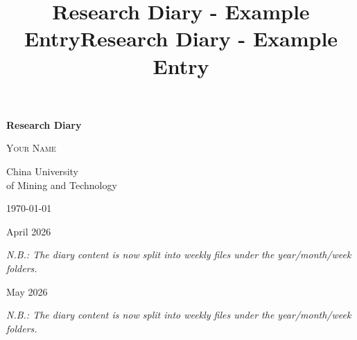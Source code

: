\documentclass[12pt,letterpaper]{ctexart}
\newcommand{\workingDate}{}
\newcommand{\userName}{Your Name}
\newcommand{\institution}{China University\\of Mining and Technology}
\begin{document}
\begin{titlepage}
\thispagestyle{empty}
\pagestyle{empty}
\centering
\vspace*{2cm}
{\Huge\bfseries Research Diary\par}
\vspace*{\fill}
{\huge \textsc{\userName}\par}
\vspace{0.8cm}
{\Large \institution\par}
\vspace*{\fill}
{\Large \today\par}
\vspace*{1.5cm}
\end{titlepage}

\renewcommand{\contentsname}{Contents}
\tableofcontents
\clearpage

\clearpage
\pagestyle{fancy}

\univlogo

\title{Research Diary - Example Entry}

\renewcommand{\workingDate}{\textsc{2026 $|$ April $|$ 01}}
{\Huge April 2026}\\[2mm]

\textit{N.B.: The diary content is now split into weekly files under the year/month/week folders.}




\newpage
\univlogo

\title{Research Diary - Example Entry}

\renewcommand{\workingDate}{\textsc{2026 $|$ May $|$ 01}}
{\Huge May 2026}\\[2mm]

\textit{N.B.: The diary content is now split into weekly files under the year/month/week folders.}




\newpage
\printbibliography[title={References}]
\end{document}
